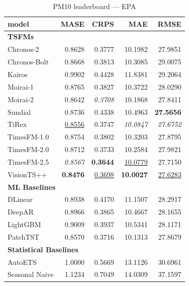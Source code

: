 \begin{table}[H]
\caption{PM10 leaderboard --- EPA}
\centering
\begin{small}
\begin{tabular}{lrrrr}
\toprule
model & MASE & CRPS & MAE & RMSE \\
\midrule
\multicolumn{5}{l}{\textbf{TSFMs}} \\
Chronos-2 & 0.8628 & 0.3777 & 10.1982 & 27.9851 \\
Chronos-Bolt & 0.8668 & 0.3813 & 10.3085 & 29.0075 \\
Kairos & 0.9902 & 0.4428 & 11.8381 & 29.2064 \\
Moirai-1 & 0.8765 & 0.3827 & 10.3722 & 28.0290 \\
Moirai-2 & 0.8642 & \textit{0.3708} & 10.1868 & 27.8411 \\
Sundial & 0.8736 & 0.4338 & 10.4963 & \textbf{27.5656} \\
TiRex & \underline{0.8556} & 0.3747 & \textit{10.0847} & \textit{27.6752} \\
TimesFM-1.0 & 0.8754 & 0.3802 & 10.3203 & 27.8795 \\
TimesFM-2.0 & 0.8712 & 0.3733 & 10.2584 & 27.9821 \\
TimesFM-2.5 & \textit{0.8567} & \textbf{0.3644} & \underline{10.0779} & 27.7150 \\
VisionTS++ & \textbf{0.8476} & \underline{0.3698} & \textbf{10.0027} & \underline{27.6283} \\
\midrule
\multicolumn{5}{l}{\textbf{ML Baselines}} \\
DLinear & 0.8938 & 0.4170 & 11.1507 & 28.2917 \\
DeepAR & 0.8966 & 0.3865 & 10.4667 & 28.1655 \\
LightGBM & 0.9009 & 0.3937 & 10.5341 & 28.1171 \\
PatchTST & 0.8570 & 0.3716 & 10.1313 & 27.8679 \\
\midrule
\multicolumn{5}{l}{\textbf{Statistical Baselines}} \\
AutoETS & 1.0000 & 0.5669 & 13.1126 & 30.6961 \\
Seasonal Naive & 1.1234 & 0.7049 & 14.0309 & 37.1597 \\
\bottomrule
\end{tabular}
\end{small}
\end{table}